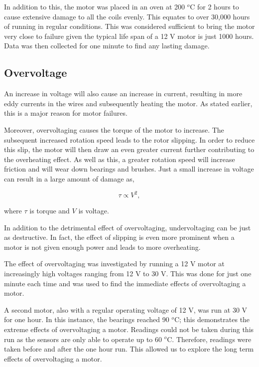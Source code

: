 In addition to this, the motor was placed in an oven at 200 $^o$C for 2 hours to cause extensive damage to all the coils evenly. This equates to over 30,000 hours of running in regular conditions. This was considered sufficient to bring the motor very close to failure given the typical life span of a 12 V motor is just 1000 hours. %
Data was then collected for one minute to find any lasting damage.



\subsection{Overvoltage}

An increase in voltage will also cause an increase in current, resulting in more eddy currents in the wires and subsequently heating the motor. As stated earlier, this is a major reason for motor failures. 

Moreover, overvoltaging causes the torque of the motor to increase. The subsequent increased rotation speed leads to the rotor slipping. In order to reduce this slip, the motor will then draw an even greater current further contributing to the overheating effect. As well as this, a greater rotation speed will increase friction and will wear down bearings and brushes. Just a small increase in voltage can result in a large amount of damage as,

\begin{equation}
\tau \propto V^2,
\label{Torque}
\end{equation}

where $\tau$ is torque and $V$ is voltage.

In addition to the detrimental effect of overvoltaging, undervoltaging can be just as destructive. In fact, the effect of slipping is even more prominent when a motor is not given enough power and leads to more overheating.


The effect of overvoltaging  was investigated by running a 12 V motor at increasingly high voltages ranging from 12 V to 30 V. This was done for just one minute each time and was used to find the immediate effects of overvoltaging a motor.
    

A second motor, also with a regular operating voltage of 12 V, was run at 30 V for one hour. In this instance, the bearings reached 90 $^o$C; this demonstrates the extreme effects of overvoltaging a motor. Readings could not be taken during this run as the sensors are only able to operate %
up to 60 $^o$C. %
Therefore, readings were taken before and after the one hour run. This allowed us to explore the long term effects of overvoltaging a motor.


